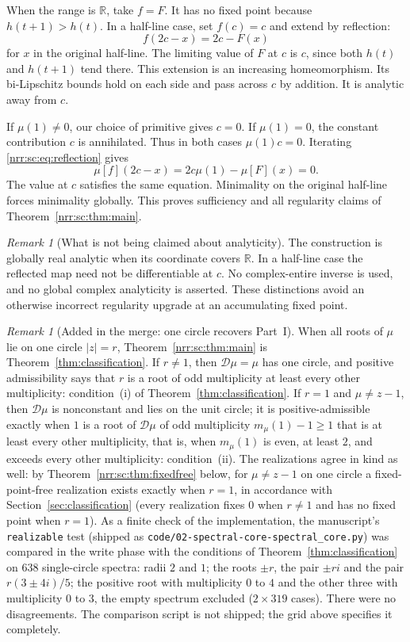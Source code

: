 \documentclass[11pt,letterpaper]{article}
\theoremstyle{definition}
\theoremstyle{remark}
\newtheorem{remark}[theorem]{Remark}
\newcommand{\R}{\mathbb R}
\newcommand{\scD}{\mathcal D}
\begin{document}
When the range is $\R$, take $f=F$. It has no fixed point because
$h(t+1)>h(t)$. In a half-line case, set $f(c)=c$ and extend by reflection:
\begin{equation}
 f(2c-x)=2c-F(x)
 \label{nrr:sc:eq:reflection}
\end{equation}
for $x$ in the original half-line. The limiting value of $F$ at $c$ is
$c$, since both $h(t)$ and $h(t+1)$ tend there.
This extension is an increasing homeomorphism. Its bi-Lipschitz bounds
hold on each side and pass across $c$ by addition.
It is analytic away from $c$.

If $\mu(1)\ne0$, our choice of primitive gives $c=0$.
If $\mu(1)=0$, the constant contribution $c$ is annihilated.
Thus in both cases $\mu(1)c=0$. Iterating \eqref{nrr:sc:eq:reflection} gives
\[
 \mu[f](2c-x)=2c\mu(1)-\mu[F](x)=0.
\]
The value at $c$ satisfies the same equation. Minimality on the original
half-line forces minimality globally. This proves sufficiency and all
regularity claims of Theorem~\ref{nrr:sc:thm:main}.

\begin{remark}[What is not being claimed about analyticity]
The construction is globally real analytic when its coordinate covers
$\R$. In a half-line case the reflected map need not be differentiable
at $c$. No complex-entire inverse is used, and no global complex
analyticity is asserted. These distinctions avoid an otherwise incorrect
regularity upgrade at an accumulating fixed point.
\end{remark}

\begin{remark}[Added in the merge: one circle recovers Part~I]
\label{nrr:sc:rem:circular}
When all roots of $\mu$ lie on one circle $|z|=r$,
Theorem~\ref{nrr:sc:thm:main} is Theorem~\ref{thm:classification}. If
$r\ne1$, then $\scD\mu=\mu$ has one circle, and positive admissibility says
that $r$ is a root of odd multiplicity at least every other multiplicity:
condition~(i) of Theorem~\ref{thm:classification}. If $r=1$ and
$\mu\ne z-1$, then $\scD\mu$ is nonconstant and lies on the unit circle; it
is positive-admissible exactly when $1$ is a root of $\scD\mu$ of odd
multiplicity $m_\mu(1)-1\ge1$ that is at least every other multiplicity,
that is, when $m_\mu(1)$ is even, at least $2$, and exceeds every other
multiplicity: condition~(ii). The realizations agree in kind as well:
by Theorem~\ref{nrr:sc:thm:fixedfree} below, for $\mu\ne z-1$ on one circle
a fixed-point-free realization exists exactly when $r=1$, in accordance with
Section~\ref{sec:classification} (every realization fixes $0$ when $r\ne1$
and has no fixed point when $r=1$). As a finite check of the implementation, the manuscript's
\texttt{realizable} test (shipped as
\nolinkurl{code/02-spectral-core-spectral_core.py}) was compared in the write
phase with the conditions of Theorem~\ref{thm:classification} on 638
single-circle spectra: radii $2$ and $1$; the roots $\pm r$, the pair
$\pm ri$ and the pair $r(3\pm4i)/5$; the positive root with multiplicity
$0$ to $4$ and the other three with multiplicity $0$ to $3$, the empty
spectrum excluded ($2\times319$ cases). There were no disagreements. The
comparison script is not shipped; the grid above specifies it completely.
\end{remark}
\end{document}
